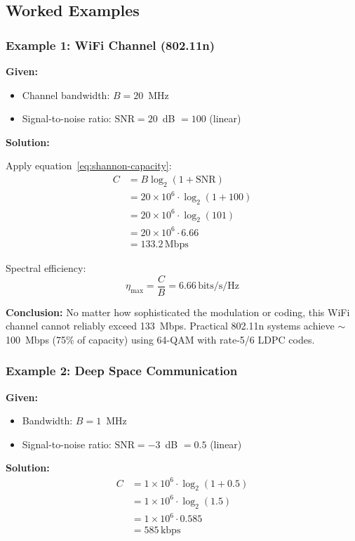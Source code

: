 \subsection{Worked Examples}

\subsubsection{Example 1: WiFi Channel (802.11n)}

\textbf{Given:}
\begin{itemize}
\item Channel bandwidth: $B = 20$~MHz
\item Signal-to-noise ratio: $\mathrm{SNR} = 20$~dB $= 100$ (linear)
\end{itemize}

\textbf{Solution:}

Apply equation~\eqref{eq:shannon-capacity}:
\begin{align}
C &= B \log_2(1 + \mathrm{SNR}) \nonumber \\
  &= 20 \times 10^6 \cdot \log_2(1 + 100) \nonumber \\
  &= 20 \times 10^6 \cdot \log_2(101) \nonumber \\
  &= 20 \times 10^6 \cdot 6.66 \nonumber \\
  &= 133.2\,\text{Mbps}
\end{align}

Spectral efficiency:
\begin{equation}
\eta_{\max} = \frac{C}{B} = 6.66\,\text{bits/s/Hz}
\end{equation}

\textbf{Conclusion:} No matter how sophisticated the modulation or coding, this WiFi channel cannot reliably exceed 133~Mbps. Practical 802.11n systems achieve $\sim$100~Mbps (75\% of ca\-pac\-ity) using 64-QAM with rate-5/6 LDPC codes.

\subsubsection{Example 2: Deep Space Communication}

\textbf{Given:}
\begin{itemize}
\item Bandwidth: $B = 1$~MHz
\item Signal-to-noise ratio: $\mathrm{SNR} = -3$~dB $= 0.5$ (linear)
\end{itemize}

\textbf{Solution:}
\begin{align}
C &= 1 \times 10^6 \cdot \log_2(1 + 0.5) \nonumber \\
  &= 1 \times 10^6 \cdot \log_2(1.5) \nonumber \\
  &= 1 \times 10^6 \cdot 0.585 \nonumber \\
  &= 585\,\text{kbps}
\end{align}

